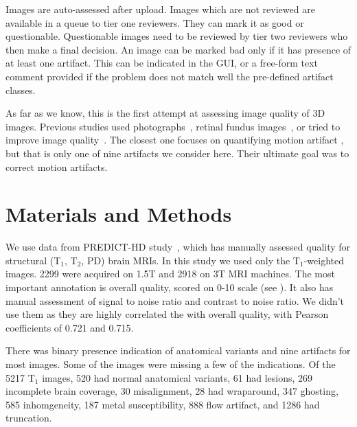 \documentclass{midl} %
\begin{document}
Images are auto-assessed after upload.
Images which are not reviewed are available in a queue to tier one reviewers. They can mark it as good or questionable. Questionable images need to be reviewed by tier two reviewers who then make a final decision. An image can be marked bad only if it has presence of at least one artifact. This can be indicated in the GUI, or a free-form text comment provided if the problem does not match well the pre-defined artifact classes.


As far as we know, this is the first attempt at assessing image quality of 3D images. Previous studies used photographs~\cite{bosse2017deep,hosu2020koniq}, retinal fundus images~\cite{yu2017image},
or tried to improve image quality~\cite{higaki2019improvement}. The closest one focuses on quantifying motion artifact \cite{butskova2021adversarial}, but that is only one of nine artifacts we consider here. Their ultimate goal was to correct motion artifacts. %

\section{Materials and Methods}

We use data from PREDICT-HD study~\cite{paulsen2014clinical}, which has manually assessed quality for structural (T$_1$, T$_2$, PD) brain MRIs. In this study we used only the T$_1$-weighted images. 2299 were acquired on 1.5T and 2918 on 3T MRI machines. The most important annotation is overall quality, scored on 0-10 scale (see ). It also has manual assessment of signal to noise ratio and contrast to noise ratio. We didn't use them as they are highly correlated the with overall quality, with Pearson coefficients of 0.721 and 0.715.

There was binary presence indication of anatomical variants and nine artifacts for most images. Some of the images were missing a few of the indications. Of the 5217 T$_1$ images, 520 had normal anatomical variants, 61 had lesions, 269 incomplete brain coverage, 30 misalignment, 28 had wraparound, 347 ghosting, 585 inhomgeneity, 187 metal susceptibility, 888 flow artifact, and 1286 had truncation.
\end{document}
